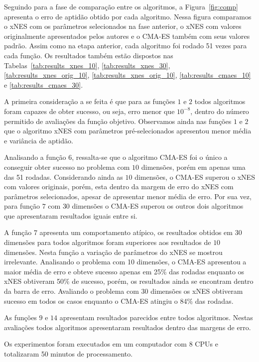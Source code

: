 Seguindo para a fase de comparação entre os algoritmos, a Figura~\ref{fig:comp} apresenta o erro de aptidão obtido por
cada algoritmo.
Nessa figura comparamos o xNES com os parâmetros selecionados na fase anterior, o xNES com valores originalmente
apresentados pelos autores e o CMA-ES também com seus valores padrão.
Assim como na etapa anterior, cada algoritmo foi rodado 51 vezes para cada função.
Os resultados também estão dispostos nas Tabelas~\ref{tab:results_xnes_10}, \ref{tab:results_xnes_30},
\ref{tab:results_xnes_orig_10}, \ref{tab:results_xnes_orig_10}, \ref{tab:results_cmaes_10} e \ref{tab:results_cmaes_30}.

A primeira consideração a se feita é que para as funções $1$ e $2$ todos algoritmos foram capazes de obter sucesso, ou seja,
erro menor que $10^{-8}$, dentro do número permitido de avaliações da função objetivo.
Observamos ainda nas funções $1$ e $2$ que o algoritmo xNES com parâmetros pré-selecionados apresentou menor média e
variância de aptidão.

Analisando a função $6$, ressalta-se que o algoritmo CMA-ES foi o único a conseguir obter sucesso no problema com $10$
dimensões, porém em apenas uma das 51 rodadas.
Considerando ainda as $10$ dimensões, o CMA-ES superou o xNES com valores originais, porém, esta dentro da margem de
erro do xNES com parâmetros selecionados, apesar de apresentar menor média de erro.
Por sua vez, para função $7$ com $30$ dimensões o CMA-ES superou os outros dois algoritmos que apresentaram resultados
iguais entre si.

A função $7$ apresenta um comportamento atípico, os resultados obtidos em $30$ dimensões para todos algoritmos foram superiores
aos resultados de $10$ dimensões.
Nesta função a variação de parâmetros do xNES se mostrou irrelevante.
Analisando o problema com 10 dimensões, o CMA-ES apresentou a maior média de erro e obteve sucesso apenas em 25\% das
rodadas enquanto os xNES obtiveram 50\% de sucesso, porém, os resultados ainda se encontram dentro da barra de erro.
Avaliando o problema com $30$ dimensões os xNES obtiveram sucesso em todos os casos enquanto o CMA-ES atingiu o 84\% das rodadas.

As funções $9$ e $14$ apresentam resultados parecidos entre todos algoritmos.
Nestas avaliações todos algoritmos apresentaram resultados dentro das margens de erro.

Os experimentos foram executados em um computador com 8 CPUs e totalizaram 50 minutos de processamento.

